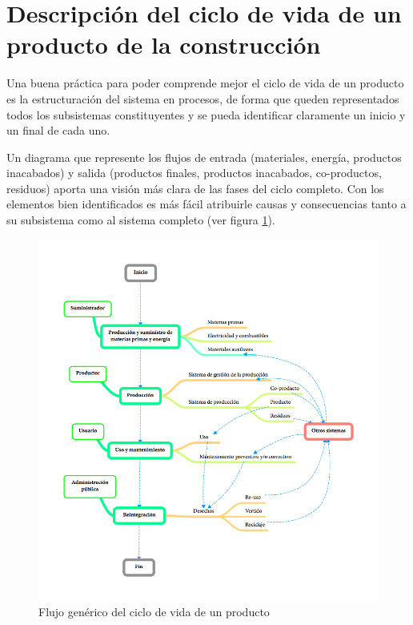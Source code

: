 \section{Descripción del ciclo de vida de un producto de la construcción}
Una buena práctica para poder comprende mejor el ciclo de vida de un producto es la estructuración del sistema en procesos, de forma que queden representados todos los subsistemas constituyentes y se pueda identificar claramente un inicio y un final de cada uno.

Un diagrama que represente los flujos de entrada (materiales, energía, productos inacabados) y salida (productos finales, productos inacabados, co-productos, residuos) aporta una visión más clara de las fases del ciclo completo. Con los elementos bien identificados es más fácil atribuirle causas y consecuencias tanto a su subsistema como al sistema completo (ver figura \ref{fig:flujo_generico_acv}).

\begin{figure}[!htb]
\centering
\includegraphics[width=15cm]{flujo_generico_acv.png}
\caption{Flujo genérico del ciclo de vida de un producto}
\label{fig:flujo_generico_acv}
\end{figure}


